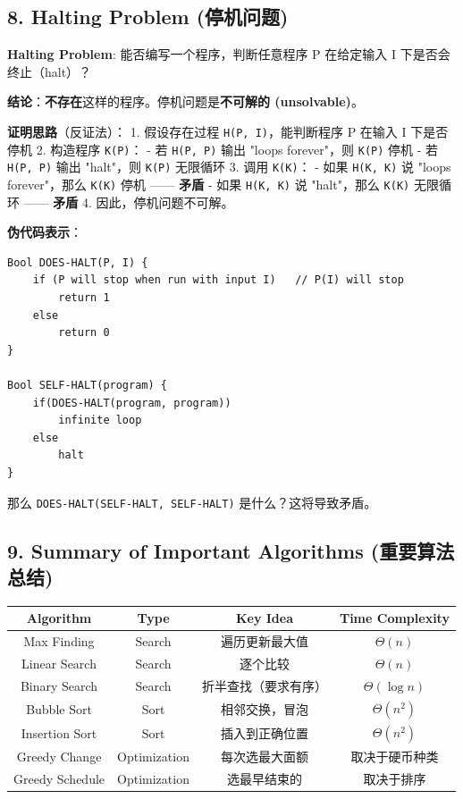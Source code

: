 \documentclass[10pt,a4paper,openany]{ctexbook}
\theoremstyle{definition}
\theoremstyle{remark}
\renewenvironment{quote}
  {\list{}{\leftmargin=1em\rightmargin=0pt\topsep=0.5pt\partopsep=0pt}\item[]}
  {\endlist}
\begin{document}
\vspace{-2pt}

\subsection{8. Halting Problem (停机问题)}

\begin{quote}
\textbf{Halting Problem}: 能否编写一个程序，判断任意程序 P 在给定输入 I 下是否会终止（halt）？

\textbf{结论}：\textbf{不存在}这样的程序。停机问题是\textbf{不可解的 (unsolvable)}。

\textbf{证明思路}（反证法）：
1. 假设存在过程 \texttt{H(P, I)}，能判断程序 P 在输入 I 下是否停机
2. 构造程序 \texttt{K(P)}：
- 若 \texttt{H(P, P)} 输出 "loops forever"，则 \texttt{K(P)} 停机
- 若 \texttt{H(P, P)} 输出 "halt"，则 \texttt{K(P)} 无限循环
3. 调用 \texttt{K(K)}：
- 如果 \texttt{H(K, K)} 说 "loops forever"，那么 \texttt{K(K)} 停机 —— \textbf{矛盾}
- 如果 \texttt{H(K, K)} 说 "halt"，那么 \texttt{K(K)} 无限循环 —— \textbf{矛盾}
4. 因此，停机问题不可解。

\textbf{伪代码表示}：
{\footnotesize\begin{verbatim}
Bool DOES-HALT(P, I) {
    if (P will stop when run with input I)   // P(I) will stop
        return 1
    else
        return 0
}

Bool SELF-HALT(program) {
    if(DOES-HALT(program, program))
        infinite loop
    else
        halt
}
\end{verbatim}}

那么 \texttt{DOES-HALT(SELF-HALT, SELF-HALT)} 是什么？这将导致矛盾。

\end{quote}
\vspace{-2pt}

\subsection{9. Summary of Important Algorithms (重要算法总结)}

\begin{center}
\begin{tabular}{cccc}
\hline
Algorithm & Type & Key Idea & Time Complexity \\ \hline
Max Finding & Search & 遍历更新最大值 & $\Theta(n)$ \\
Linear Search & Search & 逐个比较 & $\Theta(n)$ \\
Binary Search & Search & 折半查找（要求有序） & $\Theta(\log n)$ \\
Bubble Sort & Sort & 相邻交换，冒泡 & $\Theta(n^2)$ \\
Insertion Sort & Sort & 插入到正确位置 & $\Theta(n^2)$ \\
Greedy Change & Optimization & 每次选最大面额 & 取决于硬币种类 \\
Greedy Schedule & Optimization & 选最早结束的 & 取决于排序 \\
\hline
\end{tabular}

\end{center}
\end{document}
